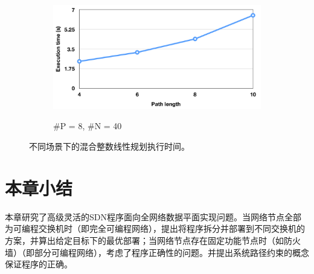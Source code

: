 \begin{figure}

  \begin{subfigure}[b]{0.4\textwidth}
      \includegraphics[width=\textwidth]{figures/global-eval-840-png.png}
      \label{fig:eval-gb:c}
      \caption{\#P = 8, \#N = 40}
  \end{subfigure}

  \caption{不同场景下的混合整数线性规划执行时间。}
  \label{fig:eval-gb} %
\end{figure}


\section{本章小结}

本章研究了高级灵活的SDN程序面向全网络数据平面实现问题。当网络节点全部为可编程交换机时（即完全可编程网络），提出将程序拆分并部署到不同交换机的方案，并算出给定目标下的最优部署；当网络节点存在固定功能节点时（如防火墙）（即部分可编程网络），考虑了程序正确性的问题。并提出系统路径约束的概念保证程序的正确。



